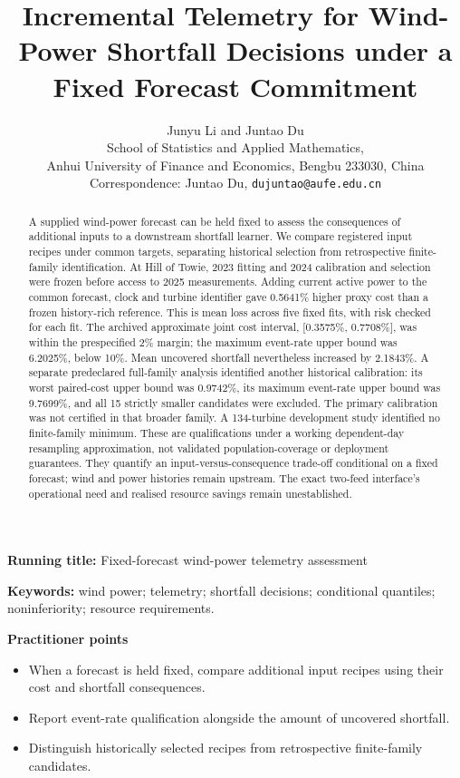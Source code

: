 \documentclass[
  british,
  11pt,
]{article}
\title{Incremental Telemetry for Wind-Power Shortfall Decisions under a
Fixed Forecast Commitment}
\author{Junyu Li and Juntao Du\\
\small School of Statistics and Applied Mathematics,\\
\small Anhui University of Finance and Economics, Bengbu 233030, China\\
\small Correspondence: Juntao Du, \texttt{dujuntao@aufe.edu.cn}}
\date{}
\providecommand{\tightlist}{%
  \setlength{\itemsep}{0pt}\setlength{\parskip}{0pt}}
\providecommand{\tightlist}{\setlength{\itemsep}{0pt}\setlength{\parskip}{0pt}}
\begin{document}
\maketitle
\begin{abstract}
A supplied wind-power forecast can be held fixed to assess the
consequences of additional inputs to a downstream shortfall learner. We
compare registered input recipes under common targets, separating
historical selection from retrospective finite-family identification. At
Hill of Towie, 2023 fitting and 2024 calibration and selection were
frozen before access to 2025 measurements. Adding current active power
to the common forecast, clock and turbine identifier gave 0.5641\%
higher proxy cost than a frozen history-rich reference. This is mean
loss across five fixed fits, with risk checked for each fit. The
archived approximate joint cost interval, {[}0.3575\%, 0.7708\%{]}, was
within the prespecified 2\% margin; the maximum event-rate upper bound
was 6.2025\%, below 10\%. Mean uncovered shortfall nevertheless
increased by 2.1843\%. A separate predeclared full-family analysis
identified another historical calibration: its worst paired-cost upper
bound was 0.9742\%, its maximum event-rate upper bound was 9.7699\%, and
all 15 strictly smaller candidates were excluded. The primary
calibration was not certified in that broader family. A 134-turbine
development study identified no finite-family minimum. These are
qualifications under a working dependent-day resampling approximation,
not validated population-coverage or deployment guarantees. They
quantify an input-versus-consequence trade-off conditional on a fixed
forecast; wind and power histories remain upstream. The exact two-feed
interface's operational need and realised resource savings remain
unestablished.
\end{abstract}

\textbf{Running title:} Fixed-forecast wind-power telemetry assessment

\textbf{Keywords:} wind power; telemetry; shortfall decisions;
conditional quantiles; noninferiority; resource requirements.

\textbf{Practitioner points}

\begin{itemize}
\tightlist
\item
  When a forecast is held fixed, compare additional input recipes using
  their cost and shortfall consequences.
\item
  Report event-rate qualification alongside the amount of uncovered
  shortfall.
\item
  Distinguish historically selected recipes from retrospective
  finite-family candidates.
\end{itemize}
\end{document}
